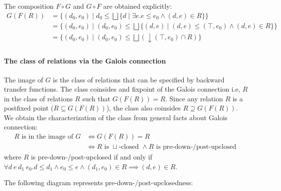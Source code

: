 \documentclass{llncs}
\newcommand{\join}{\sqcup}
\newcommand{\bigjoin}{\bigsqcup}
\newcommand{\comp}{\circ}
\newcommand{\rotleq}{\rotatebox[origin=c]{90}{$\leq$}}
\begin{document}
  The composition $F \comp G$ and $G \comp F$ are obtained explicitly:
  \begin{align*}
    G(F(R)) &= \{ (d_{0},e_{0}) \mid d_{0} \leq \bigjoin \{ d \mid \exists e.e \leq e_{0} \land (d,e) \in R \}\} \\
            &= \{ (d_{0},e_{0}) \mid (d_{0}, e_{0}) \leq \bigjoin \{ (d , e) \mid (d , e) \leq (\top , e_{0}) \land (d,e) \in R \}\} \\
            &= \{ (d_{0},e_{0}) \mid (d_{0}, e_{0}) \leq \bigjoin (\downarrow (\top , e_{0}) \cap R) \} \\
  \end{align*}


\paragraph{The class of relations via the Galois connection}
  The image of $G$ is the class of relations that can be specified by backward transfer functions.
  The class coinsides and fixpoint of the Galois connection i.e, $R$ in the class of relations $R$ such that $G(F(R)) = R$. Since any relation $R$ is a postfixed point ($R \subseteq G(F(R))$), the class also coinsides $R \supseteq G(F(R))$.
  We obtain the characterization of the class from general facts about Galois connection:
  \begin{align*}
  R \text{ is in the image of } G &\iff G(F(R)) = R  \\
                                &\iff
                                  R \text{ is }\join \text{-closed } \land R \text{ is pre-down-/post-upclosed }
  \end{align*}
  where $R$ is pre-down-/post-upclosed if and only if $\forall d\ e\ d_{1 }\ e_{0}. d \leq d_{1} \land e_{0} \leq e \land (d_{1}, e_{0}) \in R \implies (d, e) \in R$.

  The following diagram represents pre-down-/post-upclosedness:
  \begin{center}
  \end{center}
\end{document}
